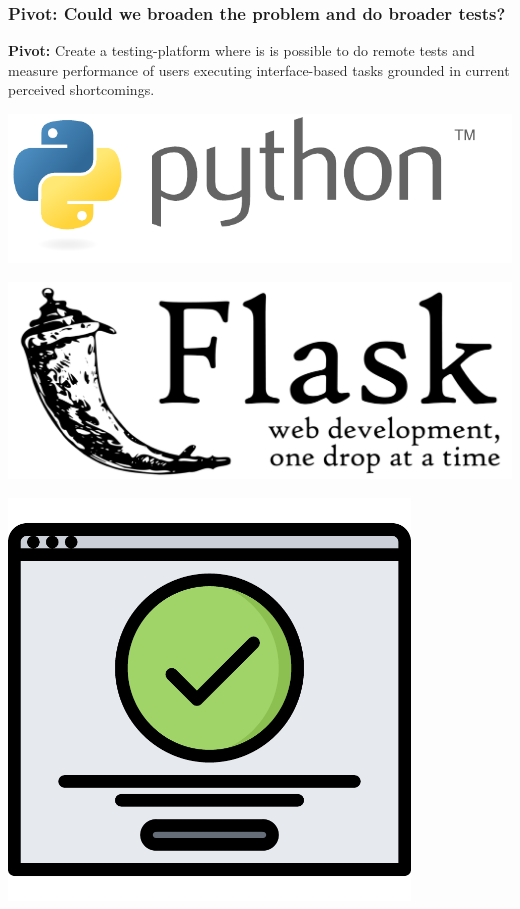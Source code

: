 \documentclass[xcolor=svgnames,10pt,aspectratio=1610]{beamer}
\begin{document}
\begin{frame}
  \frametitle{Pivot: Could we broaden the problem and do broader tests?}
  \begin{minipage}{.49\textwidth}
    \textbf{Pivot:}
    Create a testing-platform where is is possible to do remote tests and measure
    performance of users executing interface-based tasks grounded in current
    perceived shortcomings.
    \vspace{0.5cm} \\
    \begin{minipage}{0.49\textwidth}
      \centering
      \includegraphics[width=1.0\textwidth]{img/python.pdf}
    \end{minipage}
    \begin{minipage}{0.49\textwidth}
      \centering
      \includegraphics[width=1.0\textwidth]{img/flask.pdf}
    \end{minipage}
  \end{minipage}
  \begin{minipage}{.49\textwidth}
    \hspace{1.5cm}\includegraphics[width=0.8\textwidth]{img/success.pdf}
  \end{minipage}
\end{frame}
\end{document}
